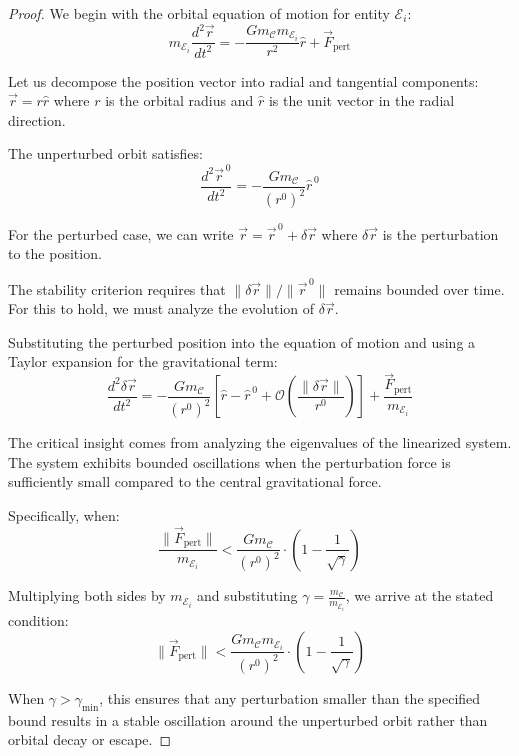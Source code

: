\begin{proof}
We begin with the orbital equation of motion for entity $\mathcal{E}_i$:
\begin{equation}
m_{\mathcal{E}_i} \frac{d^2\vec{r}}{dt^2} = -\frac{G m_{\mathcal{C}} m_{\mathcal{E}_i}}{r^2}\hat{r} + \vec{F}_{\text{pert}}
\end{equation}

Let us decompose the position vector into radial and tangential components: $\vec{r} = r\hat{r}$ where $r$ is the orbital radius and $\hat{r}$ is the unit vector in the radial direction.

The unperturbed orbit satisfies:
\begin{equation}
\frac{d^2\vec{r}^{\,0}}{dt^2} = -\frac{G m_{\mathcal{C}}}{(r^0)^2}\hat{r}^{\,0}
\end{equation}

For the perturbed case, we can write $\vec{r} = \vec{r}^{\,0} + \delta\vec{r}$ where $\delta\vec{r}$ is the perturbation to the position.

The stability criterion requires that $\|\delta\vec{r}\| / \|\vec{r}^{\,0}\|$ remains bounded over time. For this to hold, we must analyze the evolution of $\delta\vec{r}$.

Substituting the perturbed position into the equation of motion and using a Taylor expansion for the gravitational term:
\begin{equation}
\frac{d^2\delta\vec{r}}{dt^2} = -\frac{G m_{\mathcal{C}}}{(r^0)^2}\left[\hat{r} - \hat{r}^{\,0} + \mathcal{O}\left(\frac{\|\delta\vec{r}\|}{r^0}\right)\right] + \frac{\vec{F}_{\text{pert}}}{m_{\mathcal{E}_i}}
\end{equation}

The critical insight comes from analyzing the eigenvalues of the linearized system. The system exhibits bounded oscillations when the perturbation force is sufficiently small compared to the central gravitational force.

Specifically, when:
\begin{equation}
\frac{\|\vec{F}_{\text{pert}}\|}{m_{\mathcal{E}_i}} < \frac{G m_{\mathcal{C}}}{(r^0)^2} \cdot \left(1 - \frac{1}{\sqrt{\gamma}}\right)
\end{equation}

Multiplying both sides by $m_{\mathcal{E}_i}$ and substituting $\gamma = \frac{m_{\mathcal{C}}}{m_{\mathcal{E}_i}}$, we arrive at the stated condition:
\begin{equation}
\|\vec{F}_{\text{pert}}\| < \frac{G m_{\mathcal{C}} m_{\mathcal{E}_i}}{(r^0)^2} \cdot \left(1 - \frac{1}{\sqrt{\gamma}}\right)
\end{equation}

When $\gamma > \gamma_{\text{min}}$, this ensures that any perturbation smaller than the specified bound results in a stable oscillation around the unperturbed orbit rather than orbital decay or escape.
\end{proof}

